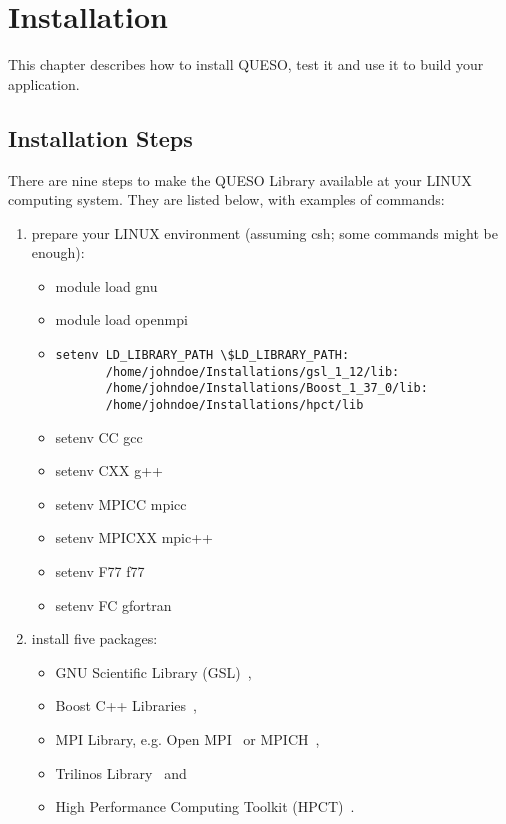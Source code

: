 \chapter{Installation}\label{ch-install}
\thispagestyle{headings}

This chapter describes how to install QUESO, test it and use it to build your application.

\section{Installation Steps}

There are nine steps to make the QUESO Library available at your LINUX computing system.
They are listed below, with examples of commands:
%
\begin{enumerate}
\item {prepare your LINUX environment (assuming csh; some commands might be enough): %
\begin{itemize}
\item module load gnu
\item module load openmpi
\item {
\begin{verbatim}
setenv LD_LIBRARY_PATH \$LD_LIBRARY_PATH:
       /home/johndoe/Installations/gsl_1_12/lib:
       /home/johndoe/Installations/Boost_1_37_0/lib:
       /home/johndoe/Installations/hpct/lib
\end{verbatim}
}
\item setenv CC gcc
\item setenv CXX g++
\item setenv MPICC mpicc
\item setenv MPICXX mpic++
\item setenv F77 f77
\item setenv FC gfortran
\end{itemize}
}
\item {install five packages: %
\begin{itemize}
\item GNU Scientific Library (GSL)~\cite{Gsl},
\item Boost C++ Libraries~\cite{Boost}, 
\item MPI Library, e.g. Open MPI~\cite{Openmpi} or MPICH~\cite{Mpich},
\item Trilinos Library~\cite{Trilinos} and
\item {High Performance Computing Toolkit (HPCT)~\cite{Hpct}.
}
\end{itemize}}
\end{enumerate}

